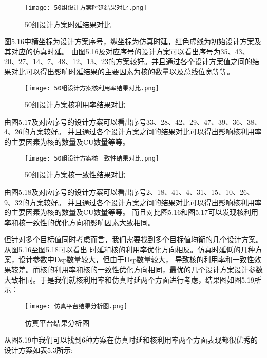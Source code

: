 \begin{figure}
    \centering
    \texttt{[image: 50组设计方案时延结果对比.png]}
    \caption{50组设计方案时延结果对比}
    \label{fig:badge}
\end{figure}

图5.16中横坐标为设计方案序号，纵坐标为仿真时延，红色虚线为初始设计方案及其对应的仿真时延。
由图5.16及对应序号的设计方案可以看出序号为35、43、20、27、14、7、48、12、13、23的方案较好。并且通过各个设计方案值之间的结果对比可以得出影响时延结果的主要因素为核的数量以及总线位宽等等。

\begin{figure}
    \centering
    \texttt{[image: 50组设计方案核利用率结果对比.png]}
    \caption{50组设计方案核利用率结果对比}
    \label{fig:badge}
\end{figure}

由图5.17及对应序号的设计方案可以看出序号33、28、42、29、47、39、36、38、4、26的方案较好。
并且通过各个设计方案之间的结果对比可以得出影响核利用率的主要因素为核的数量及CU数量等等。

\begin{figure}
    \centering
    \texttt{[image: 50组设计方案核一致性结果对比.png]}
    \caption{50组设计方案核一致性结果对比}
    \label{fig:badge}
\end{figure}

由图5.18及对应序号的设计方案可以看出序号2、18、41、4、31、15、10、26、9、32的方案较好。
并且通过各个设计方案之间的结果对比可以得出影响核利用率的主要因素为核的数量及CU数量等等。
而且对比图5.16和图5.17可以发现核利用率和核一致性的优化方向和影响因素大致相同。

但针对多个目标值同时考虑而言，我们需要找到多个目标值均衡的几个设计方案。从图5.16至图5.18可以看出
时延和核的利用率优化方向相反。仿真时延低的几种方案，设计参数中Dsp数量较大，但由于Dsp数量较大，
导致核的利用率和一致性效果较差。而核的利用率和核的一致性优化方向相同，最优的几个设计方案设计参数
大致相同。于是我们就核利用率和仿真时延两个方面进行考虑，结果图如图5.19所示：

\begin{figure}
    \centering
    \texttt{[image: 仿真平台结果分析图.png]}
    \caption{仿真平台结果分析图}
    \label{fig:badge}
\end{figure}

从图5.19中我们可以找到6种方案在仿真时延和核利用率两个方面表现都很优秀的设计方案如表5.3所示:

